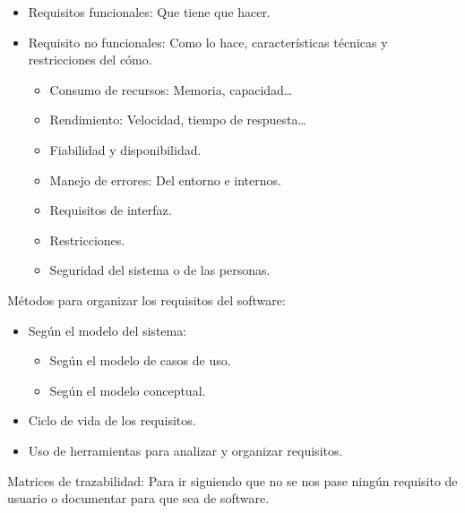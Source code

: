 \documentclass[12pt, twoside, openright]{report} %
\begin{document}
\begin{itemize}
	      \begin{itemize}
		      \item Requisitos funcionales: Que tiene que hacer.
		      \item Requisito no funcionales: Como lo hace, características
		            técnicas y restricciones del cómo.

		            \begin{itemize}
			            \item Consumo de recursos: Memoria, capacidad\ldots{}
			            \item Rendimiento: Velocidad, tiempo de respuesta\ldots{}
			            \item Fiabilidad y disponibilidad.
			            \item Manejo de errores: Del entorno e internos.
			            \item Requisitos de interfaz.
			            \item Restricciones.
			            \item Seguridad del sistema o de las personas.
		            \end{itemize}
	      \end{itemize}
\end{itemize}
\pagebreak
Métodos para organizar los requisitos del software:

\begin{itemize}
	\item Según el modelo del sistema:

	      \begin{itemize}
		      \item Según el modelo de casos de uso.
		      \item Según el modelo conceptual.
	      \end{itemize}
	\item Ciclo de vida de los requisitos.
	\item Uso de herramientas para analizar y organizar requisitos.
\end{itemize}

Matrices de trazabilidad: Para ir siguiendo que no se nos pase ningún
requisito de usuario o documentar para que sea de software.
\end{document}
